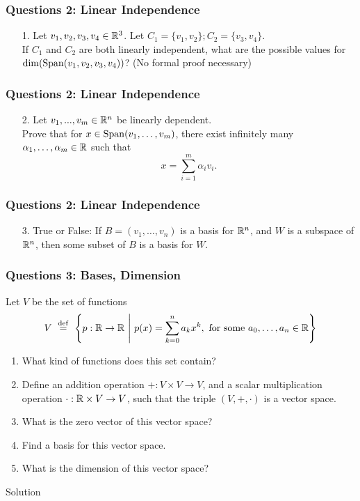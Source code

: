 \documentclass{beamer}
\begin{document}
\begin{frame}[t]
	\frametitle{Questions 2: Linear Independence}
	\grid
	\begin{enumerate}
		\item[1.] Let $v_1,v_2,v_3,v_4 \in \mathbb{R}^3$. Let $C_1 = \{v_1,v_2\}; C_2 = \{v_3,v_4\}$. \\
			If $C_1$ and $C_2$ are both linearly independent, 
			what are the possible values for ${{\rm dim}}({{\rm Span}}(v_1,v_2,v_3,v_4))$? (No formal proof necessary)
			\pause
	\end{enumerate}
\end{frame}
\begin{frame}[t]
	\frametitle{Questions 2: Linear Independence}
	\grid
	\begin{enumerate}
		\item[2.] Let $v_1,...,v_m \in \mathbb{R}^n$ be linearly dependent. \\
			Prove that for $x \in {{\rm Span}}(v_1,\dots,v_m)$, 
			there exist infinitely many $\alpha_1,\dots,\alpha_m \in \mathbb{R}$ 
			such that 
			\vspace{-0.3cm}
			$$
			x = \sum_{i=1}^m \alpha_i v_i.
			$$
			\pause
	\end{enumerate}
\end{frame}
\begin{frame}[t]
	\frametitle{Questions 2: Linear Independence}
	\grid
	\begin{enumerate}
		\item[3.] True or False: If $B=(v_1,\ldots,v_n)$ is a basis for $\mathbb{R}^n$,
			and $W$ is a subspace of $\mathbb{R}^n$, then some subset of $B$ is a basis
			for $W$.
	\end{enumerate}
\end{frame}


\begin{frame}
	\frametitle{Questions 3: Bases, Dimension}
	Let $V$ be the set of functions \\
	$$V \ \overset{\rm def}{=} \ \left\{ p: \mathbb{R} \to \mathbb{R}\ \middle| \ p(x) = \sum_{k=0}^n a_k x^k, \text{ for some } a_0,\dots,a_n \in \mathbb{R} \right\}$$
	\smallskip
	\begin{enumerate}
		\item What kind of functions does this set contain?
		\item Define an addition operation $+: V\times V \to V$,
			and a scalar multiplication operation $\cdot: \mathbb{R} \times V \to V$,
			such that the triple $(V,+,\cdot)$ is a vector space.
		\item What is the zero vector of this vector space?
		\item Find a basis for this vector space.
		\item What is the dimension of this vector space?
	\end{enumerate}
\end{frame}
\begin{frame}[t]{Solution}
	\grid
	\pause
	\pause
	\pause
\end{frame}
\end{document}
